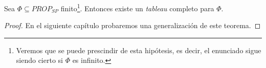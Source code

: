 \begin{prop}\label{compi}
Sea $\Phi \subseteq PROP_{SP}$ finito\footnote{Veremos que se puede prescindir de esta hipótesis, es decir, el enunciado sigue siendo cierto si $\Phi$ es infinito.}. Entonces existe un \textit{tableau} completo para $\Phi$.
\end{prop}
\begin{proof}
En el siguiente capítulo probaremos una generalización de este teorema.

\end{proof}
